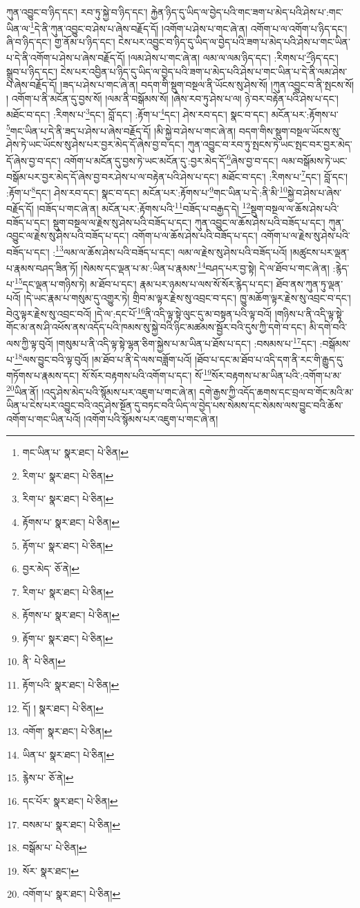 ཀུན་འབྱུང་བ་ཉིད་དང་། རབ་ཏུ་སྐྱེ་བ་ཉིད་དང་། རྐྱེན་ཉིད་དུ་ཡིད་ལ་བྱེད་པའི་གང་ཟག་པ་མེད་པའི་ཤེས་པ་:གང་ཡིན་ལ་\footnote{གང་ཡིན་པ་  སྣར་ཐང་།  པེ་ཅིན། }དེ་ནི་ཀུན་འབྱུང་བ་ཤེས་པ་ཞེས་བརྗོད་དོ། །འགོག་པ་ཤེས་པ་གང་ཞེ་ན། འགོག་པ་ལ་འགོག་པ་ཉིད་དང་། ཞི་བ་ཉིད་དང་། གྱ་ནོམ་པ་ཉིད་དང་། ངེས་པར་འབྱུང་བ་ཉིད་དུ་ཡིད་ལ་བྱེད་པའི་ཟག་པ་མེད་པའི་ཤེས་པ་གང་ཡིན་པ་དེ་ནི་འགོག་པ་ཤེས་པ་ཞེས་བརྗོད་དོ། །ལམ་ཤེས་པ་གང་ཞེ་ན། ལམ་ལ་ལམ་ཉིད་དང་། :རིགས་པ་\footnote{རིག་པ་  སྣར་ཐང་།  པེ་ཅིན། }ཉིད་དང་། སྒྲུབ་པ་ཉིད་དང་། ངེས་པར་འབྱིན་པ་ཉིད་དུ་ཡིད་ལ་བྱེད་པའི་ཟག་པ་མེད་པའི་ཤེས་པ་གང་ཡིན་པ་དེ་ནི་ལམ་ཤེས་པ་ཞེས་བརྗོད་དོ། །ཟད་པ་ཤེས་པ་གང་ཞེ་ན། བདག་གི་སྡུག་བསྔལ་ནི་ཡོངས་སུ་ཤེས་སོ། །ཀུན་འབྱུང་བ་ནི་སྤངས་སོ། །
འགོག་པ་ནི་མངོན་དུ་བྱས་སོ། །ལམ་ནི་བསྒོམས་སོ། །ཞེས་རབ་ཏུ་ཤེས་པ་ལ། ཉེ་བར་བརྟེན་པའི་ཤེས་པ་དང་། མཐོང་བ་དང་། :རིགས་པ་\footnote{རིག་པ་  སྣར་ཐང་།  པེ་ཅིན། }དང་། བློ་དང་། :རྟོག་པ་\footnote{རྟོགས་པ་  སྣར་ཐང་།  པེ་ཅིན། }དང་། ཤེས་རབ་དང་། སྣང་བ་དང་། མངོན་པར་:རྟོགས་པ་\footnote{རྟོག་པ་  སྣར་ཐང་།  པེ་ཅིན། }གང་ཡིན་པ་དེ་ནི་ཟད་པ་ཤེས་པ་ཞེས་བརྗོད་དོ། །མི་སྐྱེ་བ་ཤེས་པ་གང་ཞེ་ན། བདག་གིས་སྡུག་བསྔལ་ཡོངས་སུ་ཤེས་ཏེ་ཡང་ཡོངས་སུ་ཤེས་པར་བྱར་མེད་དོ་ཞེས་བྱ་བ་དང་། ཀུན་འབྱུང་བ་རབ་ཏུ་སྤངས་ཏེ་ཡང་སྤང་བར་བྱར་མེད་དོ་ཞེས་བྱ་བ་དང་། འགོག་པ་མངོན་དུ་བྱས་ཏེ་ཡང་མངོན་དུ་:བྱར་མེད་དོ་\footnote{བྱར་མེད་  ཅོ་ནེ། }ཞེས་བྱ་བ་དང་། ལམ་བསྒོམས་ཏེ་ཡང་བསྒོམ་པར་བྱར་མེད་དོ་ཞེས་བྱ་བར་ཤེས་པ་ལ་བརྟེན་པའི་ཤེས་པ་དང་། མཐོང་བ་དང་། :རིགས་པ་\footnote{རིག་པ་  སྣར་ཐང་།  པེ་ཅིན། }དང་། བློ་དང་། :རྟོག་པ་\footnote{རྟོགས་པ་  སྣར་ཐང་།  པེ་ཅིན། }དང་། ཤེས་རབ་དང་། སྣང་བ་དང་། མངོན་པར་:རྟོགས་པ་\footnote{རྟོག་པ་  སྣར་ཐང་།  པེ་ཅིན། }གང་ཡིན་པ་དེ་:ནི་མི་\footnote{ནི་  པེ་ཅིན། }སྐྱེ་བ་ཤེས་པ་ཞེས་བརྗོད་དོ། །བཟོད་པ་གང་ཞེ་ན། མངོན་པར་:རྟོགས་པའི་\footnote{རྟོག་པའི་  སྣར་ཐང་།  པེ་ཅིན། }བཟོད་པ་བརྒྱད་དེ། \footnote{དོ། །   སྣར་ཐང་།  པེ་ཅིན། }སྡུག་བསྔལ་ལ་ཆོས་ཤེས་པའི་བཟོད་པ་དང་། སྡུག་བསྔལ་ལ་རྗེས་སུ་ཤེས་པའི་བཟོད་པ་དང་། ཀུན་འབྱུང་ལ་ཆོས་ཤེས་པའི་བཟོད་པ་དང་། ཀུན་འབྱུང་ལ་རྗེས་སུ་ཤེས་པའི་བཟོད་པ་དང་། འགོག་པ་ལ་ཆོས་ཤེས་པའི་བཟོད་པ་དང་། འགོག་པ་ལ་རྗེས་སུ་ཤེས་པའི་བཟོད་པ་དང་། :\footnote{འགོག་  སྣར་ཐང་།  པེ་ཅིན། }ལམ་ལ་ཆོས་ཤེས་པའི་བཟོད་པ་དང་། ལམ་ལ་རྗེས་སུ་ཤེས་པའི་བཟོད་པའོ། །མཚུངས་པར་ལྡན་པ་རྣམས་བཤད་ཟིན་ཏོ། །སེམས་དང་ལྡན་པ་མ་:ཡིན་པ་རྣམས་\footnote{ཡིན་པ་  སྣར་ཐང་།  པེ་ཅིན། }བཤད་པར་བྱ་སྟེ། དེ་ལ་ཐོབ་པ་གང་ཞེ་ན། :རྙེད་པ་\footnote{རྙེས་པ་  ཅོ་ནེ། }དང་ལྡན་པ་གཉིས་ཏེ། མ་ཐོབ་པ་དང་། རྣམ་པར་ཉམས་པ་ལས་སོ་སོར་རྙེད་པ་དང་། ཐོབ་ནས་ཀུན་ཏུ་ལྡན་པའོ། །དེ་ཡང་རྣམ་པ་གསུམ་དུ་འགྱུར་ཏེ། གྲིབ་མ་ལྟར་རྗེས་སུ་འབྲང་བ་དང་། ཁྱུ་མཆོག་ལྟར་རྗེས་སུ་འབྲང་བ་དང་། བེའུ་ལྟར་རྗེས་སུ་འབྲང་བའོ། །དེ་ལ་:དང་པོ་\footnote{དང་པོར་  སྣར་ཐང་།  པེ་ཅིན། }ནི་འདི་ལྟ་སྟེ་ལུང་དུ་མ་བསྟན་པའི་ལྟ་བའོ། །གཉིས་པ་ནི་འདི་ལྟ་སྟེ་གོང་མ་ནས་ཤི་འཕོས་ནས་འདོད་པའི་ཁམས་སུ་སྐྱེ་བའི་ཉིང་མཚམས་སྦྱོར་བའི་དུས་ཀྱི་དགེ་བ་དང་། མི་དགེ་བའི་ལས་ཀྱི་ལྟ་བུའོ། །གསུམ་པ་ནི་འདི་ལྟ་སྟེ་ལྷན་ཅིག་སྐྱེས་པ་མ་ཡིན་པ་ཐོས་པ་དང་། :བསམས་པ་\footnote{བསམ་པ་  སྣར་ཐང་།  པེ་ཅིན། }དང་། :བསྒོམས་པ་\footnote{བསྒོམ་པ་  པེ་ཅིན། }ལས་བྱུང་བའི་ལྟ་བུའོ། །མ་ཐོབ་པ་ནི་དེ་ལས་བཟློག་པའོ། །ཐོབ་པ་དང་མ་ཐོབ་པ་འདི་དག་ནི་རང་གི་རྒྱུད་དུ་གཏོགས་པ་རྣམས་དང་། སོ་སོར་བརྟགས་པའི་འགོག་པ་དང་། སོ་\footnote{སོར་  སྣར་ཐང་། }སོར་བརྟགས་པ་མ་ཡིན་པའི་:འགོག་པ་མ་\footnote{འགོག་པ་  སྣར་ཐང་།  པེ་ཅིན། }ཡིན་ནོ། །འདུ་ཤེས་མེད་པའི་སྙོམས་པར་འཇུག་པ་གང་ཞེ་ན། དགེ་རྒྱས་ཀྱི་འདོད་ཆགས་དང་བྲལ་བ་གོང་མའི་མ་ཡིན་པ་ངེས་པར་འབྱུང་བའི་འདུ་ཤེས་སྔོན་དུ་བཏང་བའི་ཡིད་ལ་བྱེད་པས་སེམས་དང་སེམས་ལས་བྱུང་བའི་ཆོས་འགོག་པ་གང་ཡིན་པའོ། །འགོག་པའི་སྙོམས་པར་འཇུག་པ་གང་ཞེ་ན། 